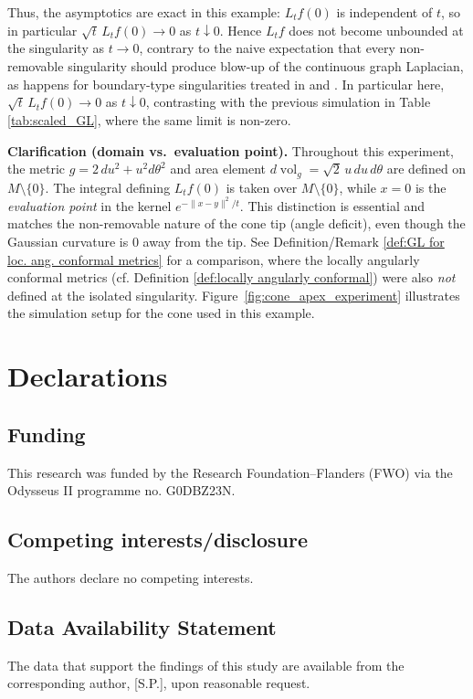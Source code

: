 \documentclass{amsart}
\let\oldcitet\citet
\renewcommand{\citet}[1]{\textcolor{blue}{\oldcitet{#1}}}
\theoremstyle{definition}
\theoremstyle{remark}
\newcommand{\nd}{\noindent}
\newcommand{\0}{\boldsymbol{0}}
\begin{document}
\nd Thus, the asymptotics are exact in this example: \(L_t f(0)\) is independent of \(t\), so in particular \(\sqrt{t}\,L_t f(0)\to 0\) as \(t\downarrow 0\). Hence $L_tf$ does not become unbounded at the singularity as $t\to0$, contrary to the naive expectation that every non-removable singularity should produce blow-up of the continuous graph Laplacian, as happens for boundary-type singularities treated in \citet{BelkinQueWangZhou2012} and \citet{PalTewodrose2025}. In particular here, $\sqrt{t}\,L_t f(0)\to 0$ as $t\downarrow 0$, contrasting with the previous simulation in Table \ref{tab:scaled_GL}, where the same limit is non-zero.



\noindent\textbf{Clarification (domain vs.\ evaluation point).}
Throughout this experiment, the metric $g=2\,du^2+u^2d\theta^2$ and area element $d\!\operatorname{vol}_g=\sqrt{2}\,u\,du\,d\theta$
are defined on $M\setminus\{0\}$. The integral defining $L_t f(0)$ is taken over
$M\setminus\{0\}$, while $x=0$ is the \emph{evaluation point} in the kernel $e^{-\|x-y\|^2/t}$. This distinction is essential and
matches the non-removable nature of the cone tip (angle deficit), even though the Gaussian curvature is $0$ away from the tip. See Definition/Remark \ref{def:GL for loc. ang. conformal metrics} for a comparison, where the locally angularly conformal metrics (cf. Definition \ref{def:locally angularly conformal}) were also \textit{not} defined at the isolated singularity. Figure~\ref{fig:cone_apex_experiment} illustrates the simulation setup for the cone used in this example.


\bigskip


\section{Declarations}
\subsection{Funding}
This research was funded by the Research Foundation–Flanders (FWO)
via the Odysseus II programme no. G0DBZ23N.
\subsection{Competing interests/disclosure}
The authors declare no competing interests.
\subsection{Data Availability Statement}
The data that support the findings of this study are available from the corresponding author, [S.P.], upon reasonable request.
\end{document}
